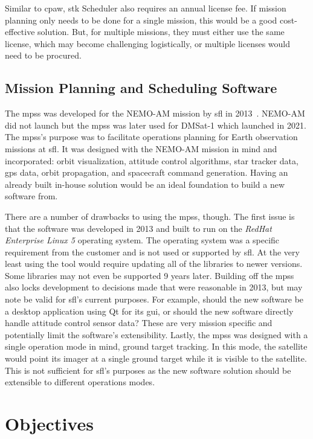 Similar to \gls{cpaw}, \gls{stk} Scheduler also requires an annual license fee.
If mission planning only needs to be done for a single mission, this would be a
good cost-effective solution. But, for multiple missions, they must either use
the same license, which may become challenging logistically, or multiple
licenses would need to be procured.


\subsection{Mission Planning and Scheduling Software}

The \gls{mpss} was developed for the NEMO-AM mission by \gls{sfl} in
2013~\cite{mehradnia_design_2013}. NEMO-AM did not launch but the \gls{mpss}
was later used for DMSat-1 which launched in 2021. The \gls{mpss}'s
purpose was to facilitate operations planning for Earth observation missions at
\gls{sfl}.  It was designed with the NEMO-AM mission in mind and incorporated:
orbit visualization, attitude control algorithms, star tracker data, \gls{gps}
data, orbit propagation, and spacecraft command generation.  Having an already
built in-house solution would be an ideal foundation to build a new software
from. 

There are a number of drawbacks to using the \gls{mpss}, though. The first
issue is that the software was developed in 2013 and built to run on the
\textit{RedHat Enterprise Linux 5} operating system. The operating system was a
specific requirement from the customer and is not used or supported by
\gls{sfl}. At the very least using the tool would require updating all of the
libraries to newer versions. Some libraries may not even be supported 9 years
later. Building off the \gls{mpss} also locks development to decisions made
that were reasonable in 2013, but may note be valid for \gls{sfl}'s current
purposes.  For example, should the new software be a desktop application using
Qt for its \gls{gui}, or should the new software directly handle attitude
control sensor data? These are very mission specific and potentially limit the
software's extensibility. Lastly, the \gls{mpss} was designed with a single
operation mode in mind, ground target tracking. In this mode, the satellite
would point its imager at a single ground target while it is visible to the
satellite. This is not sufficient for \gls{sfl}'s purposes as the new software
solution should be extensible to different operations modes.    


\section{Objectives}

